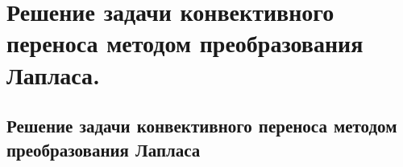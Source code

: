\chapter{Решение задачи конвективного переноса методом преобразования Лапласа.}

\section{Решение задачи конвективного переноса методом преобразования Лапласа}
\newpage
